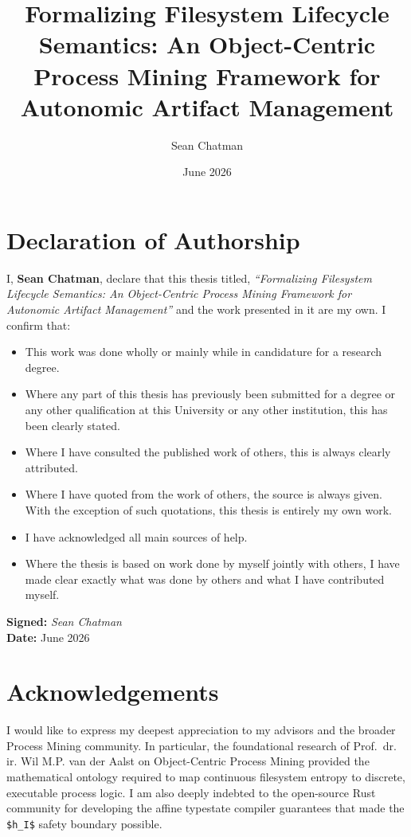 \documentclass[
  12pt,
]{report}
\title{Formalizing Filesystem Lifecycle Semantics: An Object-Centric
Process Mining Framework for Autonomic Artifact Management}
\author{Sean Chatman}
\date{June 2026}
\providecommand{\tightlist}{%
  \setlength{\itemsep}{0pt}\setlength{\parskip}{0pt}}
\begin{document}
\maketitle

{
\setcounter{tocdepth}{2}
\tableofcontents
}
\chapter{Declaration of Authorship}\label{declaration-of-authorship}

I, \textbf{Sean Chatman}, declare that this thesis titled,
\emph{``Formalizing Filesystem Lifecycle Semantics: An Object-Centric
Process Mining Framework for Autonomic Artifact Management''} and the
work presented in it are my own. I confirm that:

\begin{itemize}
\tightlist
\item
  This work was done wholly or mainly while in candidature for a
  research degree.
\item
  Where any part of this thesis has previously been submitted for a
  degree or any other qualification at this University or any other
  institution, this has been clearly stated.
\item
  Where I have consulted the published work of others, this is always
  clearly attributed.
\item
  Where I have quoted from the work of others, the source is always
  given. With the exception of such quotations, this thesis is entirely
  my own work.
\item
  I have acknowledged all main sources of help.
\item
  Where the thesis is based on work done by myself jointly with others,
  I have made clear exactly what was done by others and what I have
  contributed myself.
\end{itemize}

\textbf{Signed:} \emph{Sean Chatman}\\
\textbf{Date:} June 2026

\newpage

\chapter{Acknowledgements}\label{acknowledgements}

I would like to express my deepest appreciation to my advisors and the
broader Process Mining community. In particular, the foundational
research of Prof.~dr. ir. Wil M.P. van der Aalst on Object-Centric
Process Mining provided the mathematical ontology required to map
continuous filesystem entropy to discrete, executable process logic. I
am also deeply indebted to the open-source Rust community for developing
the affine typestate compiler guarantees that made the \texttt{\$h\_I\$}
safety boundary possible.
\end{document}
